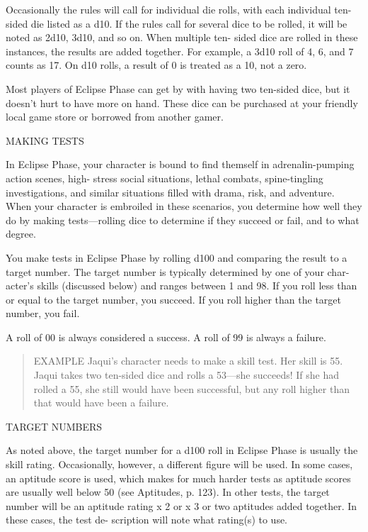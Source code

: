 Occasionally the rules will call for individual die
rolls, with each individual ten-sided die listed as a d10.
If the rules call for several dice to be rolled, it will be
noted as 2d10, 3d10, and so on. When multiple ten-
sided dice are rolled in these instances, the results are
added together. For example, a 3d10 roll of 4, 6, and
7 counts as 17. On d10 rolls, a result of 0 is treated as
a 10, not a zero.

Most players of Eclipse Phase can get by with
having two ten-sided dice, but it doesn't hurt to
have more on hand. These dice can be purchased
at your friendly local game store or borrowed from
another gamer.


MAKING TESTS

In Eclipse Phase, your character is bound to find
themself in adrenalin-pumping action scenes, high-
stress social situations, lethal combats, spine-tingling
investigations, and similar situations filled with drama,
risk, and adventure. When your character is embroiled
in these scenarios, you determine how well they do by
making tests—rolling dice to determine if they succeed
or fail, and to what degree.

You make tests in Eclipse Phase by rolling d100 and
comparing the result to a target number. The target
number is typically determined by one of your char-
acter's skills (discussed below) and ranges between 1
and 98. If you roll less than or equal to the target
number, you succeed. If you roll higher than the target
number, you fail.

A roll of 00 is always considered a success. A roll of
99 is always a failure.

\begin{quotation}
  EXAMPLE Jaqui's character needs to make a skill test. Her skill is
  55. Jaqui takes two ten-sided dice and rolls a 53—she succeeds! If
  she had rolled a 55, she still would have been successful, but any
  roll higher than that would have been a failure.
\end{quotation}

TARGET NUMBERS

As noted above, the target number for a d100 roll in
Eclipse Phase is usually the skill rating. Occasionally,
however, a different figure will be used. In some cases,
an aptitude score is used, which makes for much
harder tests as aptitude scores are usually well below
50 (see Aptitudes, p. 123). In other tests, the target
number will be an aptitude rating x 2 or x 3 or two
aptitudes added together. In these cases, the test de-
scription will note what rating(s) to use.

